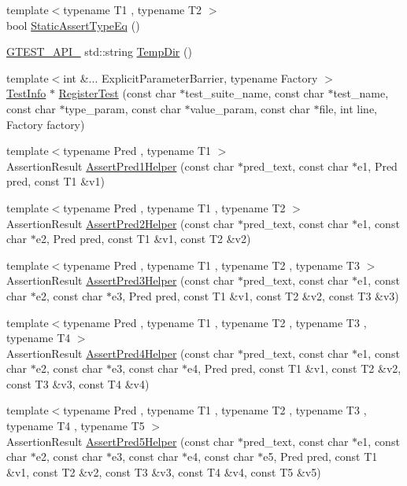 \begin{DoxyCompactItemize}
\item 
{\footnotesize template$<$typename T1 , typename T2 $>$ }\\bool \hyperlink{namespacetesting_a661e70fc6afeb5c085eed3716aa45059}{Static\+Assert\+Type\+Eq} ()
\item 
\hyperlink{gtest-port_8h_aa73be6f0ba4a7456180a94904ce17790}{G\+T\+E\+S\+T\+\_\+\+A\+P\+I\+\_\+} std\+::string \hyperlink{namespacetesting_abcf5181cecc3c07915dceb3de46ab07f}{Temp\+Dir} ()
\item 
{\footnotesize template$<$int \&... Explicit\+Parameter\+Barrier, typename Factory $>$ }\\\hyperlink{classtesting_1_1TestInfo}{Test\+Info} $\ast$ \hyperlink{namespacetesting_a302c84bdc88f2138696da2a4756b6466}{Register\+Test} (const char $\ast$test\+\_\+suite\+\_\+name, const char $\ast$test\+\_\+name, const char $\ast$type\+\_\+param, const char $\ast$value\+\_\+param, const char $\ast$file, int line, Factory factory)
\item 
{\footnotesize template$<$typename Pred , typename T1 $>$ }\\Assertion\+Result \hyperlink{namespacetesting_a7f73180474723be6e92185d6fa9e7c9f}{Assert\+Pred1\+Helper} (const char $\ast$pred\+\_\+text, const char $\ast$e1, Pred pred, const T1 \&v1)
\item 
{\footnotesize template$<$typename Pred , typename T1 , typename T2 $>$ }\\Assertion\+Result \hyperlink{namespacetesting_aa6587938029dd8733ecb885068f08247}{Assert\+Pred2\+Helper} (const char $\ast$pred\+\_\+text, const char $\ast$e1, const char $\ast$e2, Pred pred, const T1 \&v1, const T2 \&v2)
\item 
{\footnotesize template$<$typename Pred , typename T1 , typename T2 , typename T3 $>$ }\\Assertion\+Result \hyperlink{namespacetesting_ac92dcbd00a0ffb2913e65d286e321a22}{Assert\+Pred3\+Helper} (const char $\ast$pred\+\_\+text, const char $\ast$e1, const char $\ast$e2, const char $\ast$e3, Pred pred, const T1 \&v1, const T2 \&v2, const T3 \&v3)
\item 
{\footnotesize template$<$typename Pred , typename T1 , typename T2 , typename T3 , typename T4 $>$ }\\Assertion\+Result \hyperlink{namespacetesting_ae90c778d69db4682e8fd8baaa0a9f9cd}{Assert\+Pred4\+Helper} (const char $\ast$pred\+\_\+text, const char $\ast$e1, const char $\ast$e2, const char $\ast$e3, const char $\ast$e4, Pred pred, const T1 \&v1, const T2 \&v2, const T3 \&v3, const T4 \&v4)
\item 
{\footnotesize template$<$typename Pred , typename T1 , typename T2 , typename T3 , typename T4 , typename T5 $>$ }\\Assertion\+Result \hyperlink{namespacetesting_addcf52b273ce17269cbf4956cfe600a6}{Assert\+Pred5\+Helper} (const char $\ast$pred\+\_\+text, const char $\ast$e1, const char $\ast$e2, const char $\ast$e3, const char $\ast$e4, const char $\ast$e5, Pred pred, const T1 \&v1, const T2 \&v2, const T3 \&v3, const T4 \&v4, const T5 \&v5)
\end{DoxyCompactItemize}
